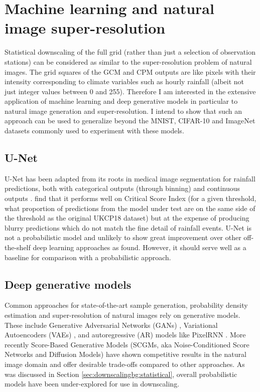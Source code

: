 \section{Machine learning and natural image super-resolution} \label{sec:mlbg}

Statistical downscaling of the full grid (rather than just a selection of observation stations) can be considered as similar to the super-resolution problem of natural images. The grid squares of the GCM and CPM outputs are like pixels with their intensity corresponding to climate variables such as hourly rainfall (albeit not just integer values between 0 and 255). Therefore I am interested in the extensive application of machine learning and deep generative models in particular to natural image generation and super-resolution. I intend to show that such an approach can be used to generalize beyond the MNIST, CIFAR-10 and ImageNet datasets commonly used to experiment with these models.

\subsection{U-Net}

U-Net \cite{Ronneberger2015unet} has been adapted from its roots in medical image segmentation for rainfall predictions, both with categorical outputs (through binning) \cite{agrawal2019unetforprecip} and continuous outputs \cite{ayzel2020rainnet,ravuri2021deepgenprecip}. \textcite{ravuri2021deepgenprecip} find that it performs well on Critical Score Index (for a given threshold, what proportion of predictions from the model under test are on the same side of the threshold as the original UKCP18 dataset) but at the expense of producing blurry predictions which do not match the fine detail of rainfall events. U-Net is not a probabilistic model and unlikely to show great improvement over other off-the-shelf deep learning approaches as \textcite{vandal2018mldownscaling} found. However, it should serve well as a baseline for comparison with a probabilistic approach.

\subsection{Deep generative models}

Common approaches for state-of-the-art sample generation, probability density estimation and super-resolution of natural images rely on generative models. These include Generative Adversarial Networks (GANs) \cite{karras2018progressive}, Variational Autoencoders (VAEs) \cite{kingma2014vaeorigin}, and autoregressive (AR) models like PixelRNN \cite{vandenoord2016pixelrnn}. More recently Score-Based Generative Models (SCGMs, aka Noise-Conditioned Score Networks and Diffusion Models) \cite{song2019smld, ho2020ddpm, song2021sbgmsde, dharwial2021diffbeatsgans} have shown competitive results in the natural image domain and offer desirable trade-offs compared to other approaches. As was discussed in Section \ref{sec:downscalingbg:statistical}, overall probabilistic models have been under-explored for use in downscaling.

